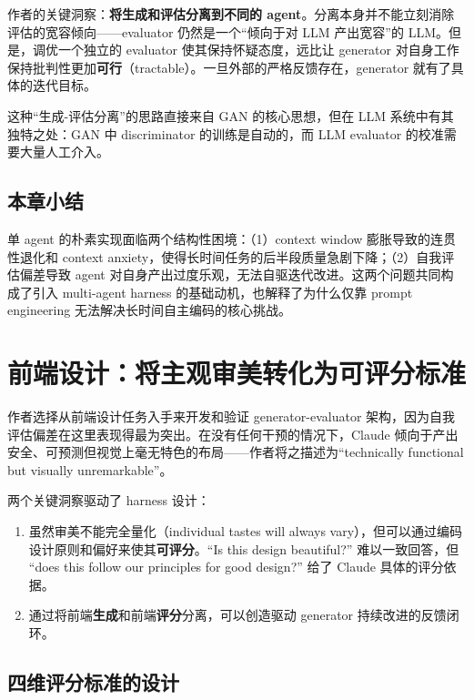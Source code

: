 \documentclass[a4paper]{article}
\begin{document}
作者的关键洞察：\textbf{将生成和评估分离到不同的 agent}。分离本身并不能立刻消除评估的宽容倾向——evaluator 仍然是一个``倾向于对 LLM 产出宽容''的 LLM。但是，调优一个独立的 evaluator 使其保持怀疑态度，远比让 generator 对自身工作保持批判性更加\textbf{可行}（tractable）。一旦外部的严格反馈存在，generator 就有了具体的迭代目标。

这种``生成-评估分离''的思路直接来自 GAN 的核心思想，但在 LLM 系统中有其独特之处：GAN 中 discriminator 的训练是自动的，而 LLM evaluator 的校准需要大量人工介入。

\subsection{本章小结}

单 agent 的朴素实现面临两个结构性困境：（1）context window 膨胀导致的连贯性退化和 context anxiety，使得长时间任务的后半段质量急剧下降；（2）自我评估偏差导致 agent 对自身产出过度乐观，无法自驱迭代改进。这两个问题共同构成了引入 multi-agent harness 的基础动机，也解释了为什么仅靠 prompt engineering 无法解决长时间自主编码的核心挑战。


\section{前端设计：将主观审美转化为可评分标准}

作者选择从前端设计任务入手来开发和验证 generator-evaluator 架构，因为自我评估偏差在这里表现得最为突出。在没有任何干预的情况下，Claude 倾向于产出安全、可预测但视觉上毫无特色的布局——作者将之描述为``technically functional but visually unremarkable''。

两个关键洞察驱动了 harness 设计：

\begin{enumerate}[leftmargin=1.5em]
    \item 虽然审美不能完全量化（individual tastes will always vary），但可以通过编码设计原则和偏好来使其\textbf{可评分}。``Is this design beautiful?'' 难以一致回答，但 ``does this follow our principles for good design?'' 给了 Claude 具体的评分依据。
    \item 通过将前端\textbf{生成}和前端\textbf{评分}分离，可以创造驱动 generator 持续改进的反馈闭环。
\end{enumerate}

\subsection{四维评分标准的设计}
\end{document}
